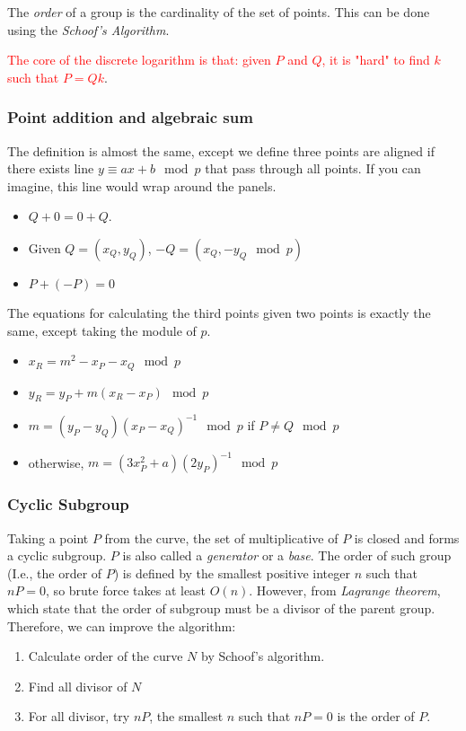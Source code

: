 \documentclass[10pt]{article}
\newcommand{\HL}[1]{\textcolor{red}{#1}}
\begin{document}
The \emph{order} of a group is the cardinality of the set of points. This can
be done using the \emph{Schoof's Algorithm}.

\HL{The core of the discrete logarithm is that: given $P$ and $Q$, it is "hard" to find $k$ such that $P = Qk$}.
\subsubsection{Point addition and algebraic sum}
The definition is almost the same, except we define three points are aligned if
there exists line $y \equiv ax + b \mod p$ that pass through all points. If you
can imagine, this line would wrap around the panels.
\begin{itemize}
    \item $Q + 0 = 0 + Q$.
    \item Given $Q = (x_Q, y_Q)$, $-Q = (x_Q, -y_Q \mod p)$
    \item $P + (-P) = 0$
\end{itemize}

The equations for calculating the third points given two points is exactly the
same, except taking the module of $p$.
\begin{itemize}
    \item $x_R = m^2 - x_P - x_Q \mod p$
    \item $y_R = y_P + m(x_R - x_P) \mod p$
    \item $m = (y_P - y_Q)(x_P - x_Q)^{-1} \mod p$ if $P \neq Q \mod p$
    \item otherwise, $m = (3x^2_P + a)(2y_P)^{-1} \mod p$
\end{itemize}

\subsubsection{Cyclic Subgroup}
Taking a point $P$ from the curve, the set of multiplicative of $P$ is closed
and forms a cyclic subgroup. $P$ is also called a \emph{generator} or a \emph{base}.
The order of such group (I.e., the order of $P$) is defined by the smallest
positive integer $n$ such that $nP = 0$, so brute force takes at least $O(n)$.
However, from \emph{Lagrange theorem}, which state that the order of subgroup must
be a divisor of the parent group.
Therefore, we can improve the algorithm: 
\begin{enumerate}
    \item Calculate order of the curve $N$ by Schoof's algorithm.
    \item Find all divisor of $N$
    \item For all divisor, try $nP$, the smallest $n$ such that $nP=0$ is the
        order of $P$.
\end{enumerate}
\end{document}
